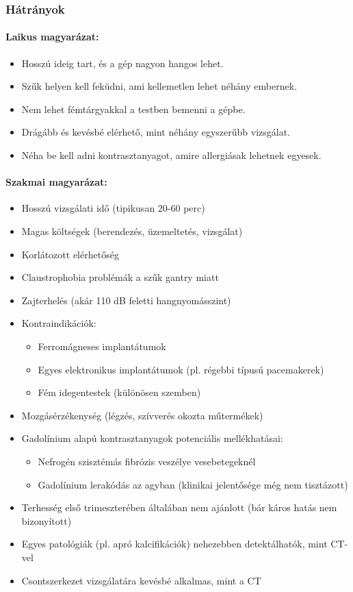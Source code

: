 \documentclass[a4paper,12pt]{article}
\begin{document}
\subsubsection{Hátrányok}

\paragraph{Laikus magyarázat:} \begin{itemize} \item Hosszú ideig tart, és a gép nagyon hangos lehet. \item Szűk helyen kell feküdni, ami kellemetlen lehet néhány embernek. \item Nem lehet fémtárgyakkal a testben bemenni a gépbe. \item Drágább és kevésbé elérhető, mint néhány egyszerűbb vizsgálat. \item Néha be kell adni kontrasztanyagot, amire allergiásak lehetnek egyesek. \end{itemize}

\paragraph{Szakmai magyarázat:} \begin{itemize} \item Hosszú vizsgálati idő (tipikusan 20-60 perc) \item Magas költségek (berendezés, üzemeltetés, vizsgálat) \item Korlátozott elérhetőség \item Claustrophobia problémák a szűk gantry miatt \item Zajterhelés (akár 110 dB feletti hangnyomásszint) \item Kontraindikációk: \begin{itemize} \item Ferromágneses implantátumok \item Egyes elektronikus implantátumok (pl. régebbi típusú pacemakerek) \item Fém idegentestek (különösen szemben) \end{itemize} \item Mozgásérzékenység (légzés, szívverés okozta műtermékek) \item Gadolínium alapú kontrasztanyagok potenciális mellékhatásai: \begin{itemize} \item Nefrogén szisztémás fibrózis veszélye vesebetegeknél \item Gadolínium lerakódás az agyban (klinikai jelentősége még nem tisztázott) \end{itemize} \item Terhesség első trimeszterében általában nem ajánlott (bár káros hatás nem bizonyított) \item Egyes patológiák (pl. apró kalcifikációk) nehezebben detektálhatók, mint CT-vel \item Csontszerkezet vizsgálatára kevésbé alkalmas, mint a CT \end{itemize}
\end{document}

